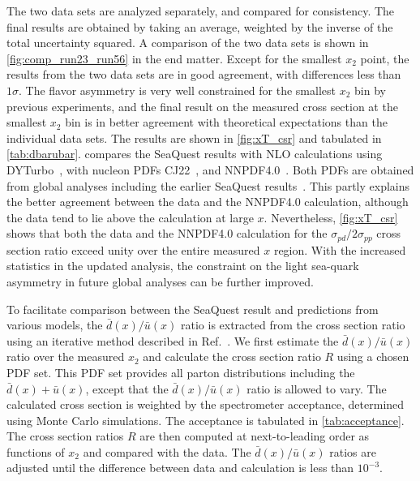 \documentclass[reprint,aps,unsortedaddress,superscriptaddress,prl,floatfix,showpacs,linenumbers]{revtex4-2}
\begin{document}
The two data sets are analyzed separately, and compared for consistency.
The final results are obtained by taking an average,
weighted by the inverse of the total uncertainty squared.
A comparison of the two data sets is shown in \cref{fig:comp_run23_run56} in the end matter.
Except for the smallest $x_2$ point, the results from the two data sets are in good agreement,
with differences less than $1\sigma$.
The flavor asymmetry is very well constrained for the smallest $x_2$ bin by previous experiments,
and the final result on the measured cross section at the smallest $x_2$ bin is in better agreement
with theoretical expectations than the individual data sets.
The results are shown in \cref{fig:xT_csr} and tabulated in \cref{tab:dbarubar}.
 compares the SeaQuest results with
NLO calculations using DYTurbo~\cite{camarda2020},
with nucleon PDFs  CJ22~\cite{accardi2023}, and NNPDF4.0~\cite{ball2022a}.
Both PDFs are obtained from global analyses including
the earlier SeaQuest results~\cite{dove2021}.
This partly explains the better agreement between the data and the NNPDF4.0 calculation, although the data tend to lie above the calculation at large $x$.
Nevertheless, \cref{fig:xT_csr}
shows that both the data and the NNPDF4.0 calculation for the
$\sigma_{pd}/2\sigma_{pp}$ cross section ratio exceed unity over the
entire measured $x$ region.
With the increased statistics in the updated analysis,
the constraint on the light sea-quark asymmetry in future global analyses can be further improved.

To facilitate comparison between the SeaQuest result and predictions
from various models, the $\bar{d}(x)/\bar{u}(x)$ ratio is extracted from the
cross section ratio using an iterative method described in
Ref.~\cite{dove2021}.
We first estimate the $\bar{d}(x)/\bar{u}(x)$ ratio over the measured $x_2$
and calculate the cross section ratio $R$ using a chosen PDF set.
This PDF set provides all parton distributions including the
$\bar{d}(x)+\bar{u}(x)$, except that the $\bar{d}(x)/\bar{u}(x)$
ratio is allowed to vary.
The calculated cross section is weighted by the spectrometer acceptance, determined using Monte Carlo simulations.
The acceptance is tabulated in \cref{tab:acceptance}.
The cross section ratios $R$ are then computed at next-to-leading order
as functions of $x_2$ and compared with the data. The $\bar{d}(x)/\bar{u}(x)$
ratios are adjusted until the difference between data and
calculation is less than $10^{-3}$.
\end{document}
